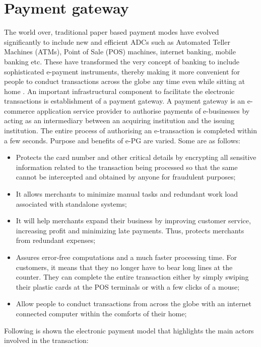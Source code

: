 \section{Payment gateway}
\label{sec:payment_gateway}
The world over, traditional paper based payment modes have evolved significantly to include new and efficient ADCs such as Automated Teller Machines (ATMs), Point of Sale (POS) machines, internet banking, mobile banking etc. These have transformed the very concept of banking to include sophisticated e-payment instruments, thereby making it more convenient for people to conduct transactions across the globe any time even while sitting at home \cite{payment_gateway_a}.
\newline
An important infrastructural component to facilitate the electronic transactions is establishment of a payment gateway. A payment gateway is an e-commerce application service provider to authorise payments of e-businesses by acting as an intermediary between an acquiring institution and the issuing institution. The entire process of authorising an e-transaction is completed within a few seconds.
\newline
Purpose and benefits of e-PG are varied. Some are as follows:
\begin{itemize}
\item Protects the card number and other critical details by encrypting all sensitive information related to the transaction being processed so that the same cannot be intercepted and obtained by anyone for fraudulent purposes;
\item It allows merchants to minimize manual tasks and redundant work load associated with standalone systems;
\item It will help merchants expand their business by improving customer service, increasing profit and minimizing late payments. Thus, protects merchants from redundant expenses;
\item Assures error-free computations and a much faster processing time. For customers, it means that they no longer have to bear long lines at the counter. They can complete the entire transaction either by simply swiping their plastic cards at the POS terminals or with a few clicks of a mouse;
\item Allow people to conduct transactions from across the globe with an internet connected computer within the comforts of their home;
\end{itemize}
Following is shown the electronic payment model \cite{payment_gateway_model} that highlights the main actors involved in the transaction:
